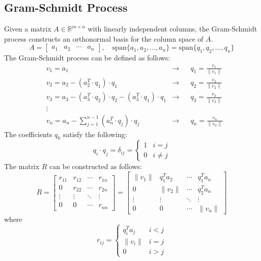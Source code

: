 \documentclass[11pt]{article}
\begin{document}
\subsection{Gram-Schmidt Process}
Given a matrix \(A \in \mathbb{R}^{m \times n}\) with linearly independent columns, the Gram-Schmidt process constructs an orthonormal basis for the column space of \(A\).
\[A = \begin{bmatrix}
    a_1 & a_2 & \cdots & a_n
\end{bmatrix}, \quad \text{span}\{a_1, a_2, \ldots, a_n\} = \text{span}\{q_1, q_2, \ldots, q_n\}\]
The Gram-Schmidt process can be defined as follows:
\begin{align*}
    & v_1 = a_1 & \longrightarrow & & q_1 = \frac{v_1}{\|v_1\|} \\
    & v_2 = a_2 - (a_2^T \cdot q_1) \cdot q_1 & \longrightarrow & & q_2 = \frac{v_2}{\|v_2\|} \\
    & v_3 = a_3 - (a_3^T \cdot q_2) \cdot q_2 - (a_3^T \cdot q_1) \cdot q_1 & \longrightarrow  & & q_3 = \frac{v_3}{\|v_3\|} \\
    & \vdots & & & \\
    & v_n = a_n - \sum_{j=1}^{n-1} (a_n^T \cdot q_j) \cdot q_j & \longrightarrow & & q_n = \frac{v_n}{\|v_n\|}
\end{align*}
The coefficients \(q_k\) satisfy the following:
\[q_i \cdot q_j = \delta_{ij} = \begin{cases}
    1 & i = j \\
    0 & i \neq j
\end{cases}\]
The matrix \(R\) can be constructed as follows:
\[R = \begin{bmatrix}
    r_{11} & r_{12} & \cdots & r_{1n} \\
    0 & r_{22} & \cdots & r_{2n} \\
    \vdots & \vdots & \ddots & \vdots \\
    0 & 0 & \cdots & r_{nn}
\end{bmatrix} = \begin{bmatrix}
    \|v_1\| & q_1^T a_2 & \cdots & q_1^T a_n \\
    0 & \|v_2\| & \cdots & q_2^T a_n \\
    \vdots & \vdots & \ddots & \vdots \\
    0 & 0 & \cdots & \|v_n\|
\end{bmatrix}\]
where
\[r_{ij} = \begin{cases}
    q_i^T a_j & i < j \\
    \|v_i\| & i = j \\
    0 & i > j
\end{cases}\]
\end{document}
